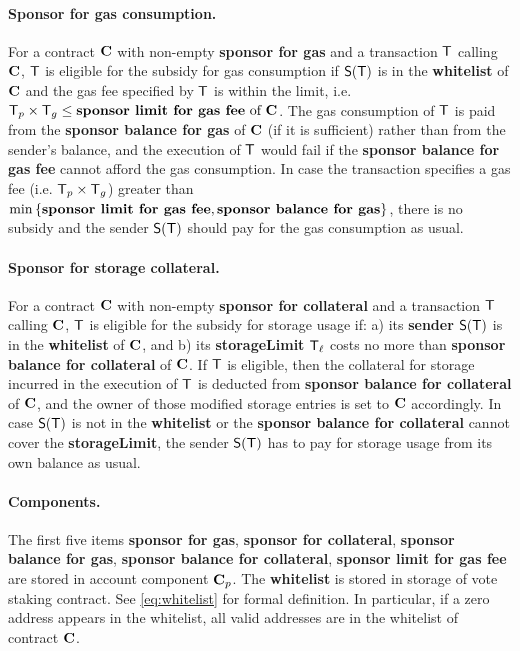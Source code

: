\paragraph{Sponsor for gas consumption.}
For a contract $\mathbf{C}$ with non-empty {\bf sponsor for gas} and a transaction $\textsf{T}$ calling $\mathbf{C}$, 
$\textsf{T}$ is eligible for the subsidy for gas consumption 
if $\mathsf{S} (\textsf{T})$ is in the \textbf{whitelist} of $\mathbf{C}$
and the gas fee specified by $\textsf{T}$ is within the limit, i.e. $\textsf{T}_p\times\textsf{T}_g \le \text{\textbf{sponsor limit for gas fee} of $\mathbf{C}$}$.
The gas consumption of $\textsf{T}$ is paid from the \textbf{sponsor balance for gas} of $\mathbf{C}$ (if it is sufficient) rather than from the sender's balance,
and the execution of $\textsf{T}$ would fail if the \textbf{sponsor balance for gas fee} cannot afford the gas consumption.
In case the transaction specifies a gas fee (i.e. $\textsf{T}_p\times\textsf{T}_g$) greater than $\min{\left \{{\textbf{sponsor limit for gas fee}, \textbf{sponsor balance for gas}} \right \}}$, there is no subsidy and the sender $\mathsf{S}{\left({\textsf{T}} \right)}$ should pay for the gas consumption as usual.

\paragraph{Sponsor for storage collateral.}
For a contract $\mathbf{C}$ with non-empty {\bf sponsor for collateral} and a transaction $\textsf{T}$ calling $\mathbf{C}$,
$\textsf{T}$ is eligible for the subsidy for storage usage if: 
a) its {\bf sender} $\mathsf{S}{\left({\textsf{T}} \right)}$ is in the \textbf{whitelist} of $\mathbf{C}$, and 
b) its {\bf storageLimit} $\textsf{T}_\ell$ costs no more than {\bf sponsor balance for collateral} of $\mathbf{C}$. 
If $\textsf{T}$ is eligible, then the collateral for storage incurred in the execution of $\textsf{T}$ 
is deducted from \textbf{sponsor balance for collateral} of $\mathbf{C}$, 
and the owner of those modified storage entries is set to $\mathbf{C}$ accordingly.
In case $\mathsf{S}{\left({\textsf{T}} \right)}$ is not in the \textbf{whitelist} or the \textbf{sponsor balance for collateral} cannot cover the {\bf storageLimit}, the sender $\mathsf{S}{\left({\textsf{T}} \right)}$ has to pay for storage usage from its own balance as usual.

\paragraph{Components.} The first five items {\bf sponsor for gas}, {\bf sponsor for collateral}, {\bf sponsor balance for gas}, {\bf sponsor balance for collateral}, {\bf sponsor limit for gas fee} are stored in account component $\mathbf{C}_p$. The {\bf whitelist} is stored in storage of vote staking contract. See \cref{eq:whitelist} for formal definition. 
In particular, if a zero address appears in the whitelist, all valid addresses are in the whitelist of contract $\mathbf{C}$. 


